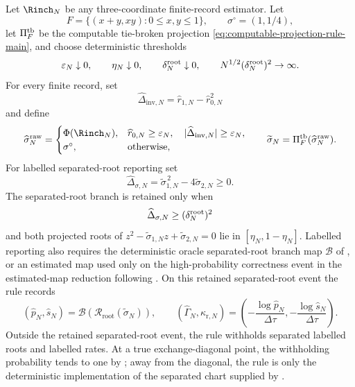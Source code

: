 \begin{proposition}\label{prop:finite-record-quotient-projection-reporting-main}
Let \(\Rinch_N\) be any three-coordinate finite-record estimator.  Let
\[
F=\{(x+y,xy):0\le x,y\le1\},\qquad \sigma^\circ=(1,1/4),
\]
let \(\Pi_F^{\rm tb}\) be the computable tie-broken projection
\eqref{eq:computable-projection-rule-main}, and choose deterministic thresholds
\[
\varepsilon_N\downarrow0,\qquad \eta_N\downarrow0,\qquad
\delta_N^{\rm root}\downarrow0,\qquad
N^{1/2}(\delta_N^{\rm root})^2\to\infty .
\]
For every finite record, set
\[
\widehat\Delta_{\mathrm{inv},N}=\widehat r_{1,N}-\widehat r_{0,N}^2
\]
and define
\[
\widehat\sigma^{\rm raw}_N=
\begin{cases}
\Phi(\Rinch_N),
&\widehat r_{0,N}\ge\varepsilon_N,\quad |\widehat\Delta_{\mathrm{inv},N}|\ge\varepsilon_N,\\
\sigma^\circ,&\text{otherwise,}
\end{cases}
\qquad
\widetilde\sigma_N=\Pi_F^{\rm tb}(\widehat\sigma^{\rm raw}_N).
\]
For labelled separated-root reporting set
\[
\widehat\Delta_{\sigma,N}
=\widetilde\sigma_{1,N}^{\,2}-4\widetilde\sigma_{2,N}\ge0 .
\]
The separated-root branch is retained only when
\[
\widehat\Delta_{\sigma,N}\ge(\delta_N^{\rm root})^2
\]
and both projected roots of
\(z^2-\widetilde\sigma_{1,N}z+\widetilde\sigma_{2,N}=0\) lie in
\([\eta_N,1-\eta_N]\).  Labelled reporting also requires the deterministic
oracle separated-root branch map \(\mathcal B\) of
, or an estimated map used only on
the high-probability correctness event in the estimated-map reduction following
.  On this retained separated-root
event the rule records
\[
(\widehat p_N,\widehat s_N)
=\mathcal B(\mathcal R_{\mathrm{root}}(\widetilde\sigma_N)),
\qquad
(\widehat\Gamma_N,\widehat\kappa_{\mathrm r,N})
=\left(-\frac{\log\widehat p_N}{\Delta\tau},
       -\frac{\log\widehat s_N}{\Delta\tau}\right).
\]
Outside the retained separated-root event, the rule withholds separated
labelled roots and labelled rates.  At a true exchange-diagonal point, the
withholding probability tends to one by
; away from the diagonal, the
rule is only the deterministic implementation of the separated chart supplied
by .
\end{proposition}

